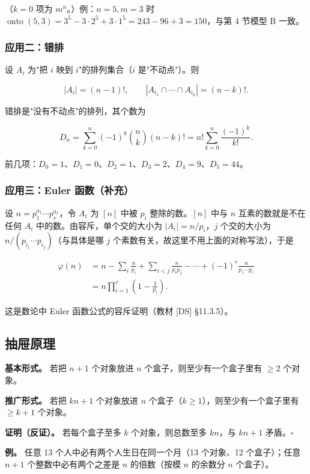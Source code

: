 （$k=0$ 项为 $m^n$。）例：$n=5,m=3$ 时 $\operatorname{onto}(5,3)=3^5-3\cdot2^5+3\cdot1^5=243-96+3=150$，与第 4 节模型 B 一致。

\subsubsection{应用二：错排}


设 $A_i$ 为"把 $i$ 映到 $i$"的排列集合（$i$ 是"不动点"）。则

\[
|A_i|=(n-1)!,\qquad |A_{i_1}\cap\cdots\cap A_{i_k}|=(n-k)! .
\]

错排是"没有不动点"的排列，其个数为

\[
D_n=\sum_{k=0}^{n}(-1)^k\binom nk(n-k)!
=n!\sum_{k=0}^{n}\frac{(-1)^k}{k!}.
\]

前几项：$D_0=1$、$D_1=0$、$D_2=1$、$D_3=2$、$D_4=9$、$D_5=44$。

\subsubsection{应用三：Euler 函数（补充）}


设 $n=p_1^{a_1}\cdots p_r^{a_r}$，令 $A_i$ 为 $[n]$ 中被 $p_i$ 整除的数。$[n]$ 中与 $n$ 互素的数就是不在任何 $A_i$ 中的数。由容斥，单个交的大小为 $|A_i|=n/p_i$，$j$ 个交的大小为 $n/(p_{i_1}\cdots p_{i_j})$（与具体是哪 $j$ 个素数有关，故这里不用上面的对称写法），于是

\[
\begin{aligned}
\varphi(n)&=n-\sum_i\frac{n}{p_i}+\sum_{i<j}\frac{n}{p_ip_j}-\cdots+(-1)^r\frac{n}{p_1\cdots p_r}\\
&=n\prod_{i=1}^{r}\left(1-\frac1{p_i}\right).
\end{aligned}
\]

这是数论中 Euler 函数公式的容斥证明（教材 [DS] §11.3.5）。

\subsection{抽屉原理}


\textbf{基本形式。} 若把 $n+1$ 个对象放进 $n$ 个盒子，则至少有一个盒子里有 $\ge2$ 个对象。

\textbf{推广形式。} 若把 $kn+1$ 个对象放进 $n$ 个盒子（$k\ge1$），则至少有一个盒子里有 $\ge k+1$ 个对象。

\textbf{证明（反证）。} 若每个盒子至多 $k$ 个对象，则总数至多 $kn$，与 $kn+1$ 矛盾。$\square$

\textbf{例。} 任意 13 个人中必有两个人生日在同一个月（13 个对象、12 个盒子）；任意 $n+1$ 个整数中必有两个之差是 $n$ 的倍数（按模 $n$ 的余数分 $n$ 个盒子）。

